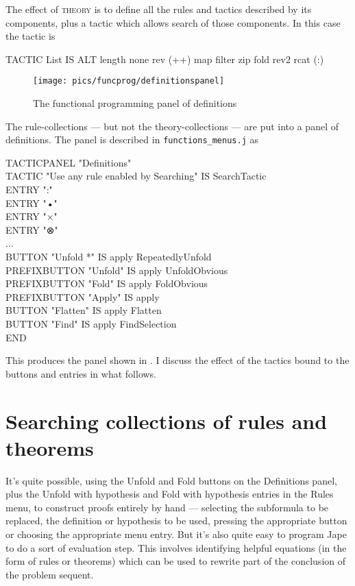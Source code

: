 The effect of \textsc{theory} is to define all the rules and tactics described by its components, plus a tactic which allows search of those components. In this case the tactic is
\begin{japeish}
TACTIC List IS ALT length none rev (++) map filter zip fold rev2 rcat (:)
\end{japeish}

\begin{figure}
\begin{center}
\texttt{[image: pics/funcprog/definitionspanel]}
\caption{The functional programming panel of definitions}
\label{fig:funcprog:definitionspanel}
\end{center}
\end{figure}

The rule-collections --- but not the theory-collections --- are put into a panel of definitions. The panel is described in \texttt{functions\_menus.j} as
\begin{japeish}
TACTICPANEL "Definitions" \\
\tab TACTIC "Use any rule enabled by Searching" IS SearchTactic\\
\tab ENTRY ":"\\
\tab ENTRY "•" \\
\tab ENTRY "×" \\
\tab ENTRY "⊗" \\
\tab ...\\
\tab BUTTON "Unfold *" IS apply RepeatedlyUnfold\\
\tab PREFIXBUTTON "Unfold" IS apply UnfoldObvious\\
\tab PREFIXBUTTON "Fold" IS apply FoldObvious\\
\tab PREFIXBUTTON "Apply" IS apply\\
\tab BUTTON "Flatten" IS apply Flatten\\
\tab BUTTON "Find" IS apply FindSelection\\
END
\end{japeish}
This produces the panel shown in . I discuss the effect of the tactics bound to the buttons and entries in what follows.

\section{Searching collections of rules and theorems}

It's quite possible, using the Unfold and Fold buttons on the Definitions panel, plus the Unfold with hypothesis and Fold with hypothesis entries in the Rules menu, to construct proofs entirely by hand --- selecting the subformula to be replaced, the definition or hypothesis to be used, pressing the appropriate button or choosing the appropriate menu entry. But it's also quite easy to program Jape to do a sort of evaluation step. This involves identifying helpful equations (in the form of rules or theorems) which can be used to rewrite part of the conclusion of the problem sequent.

